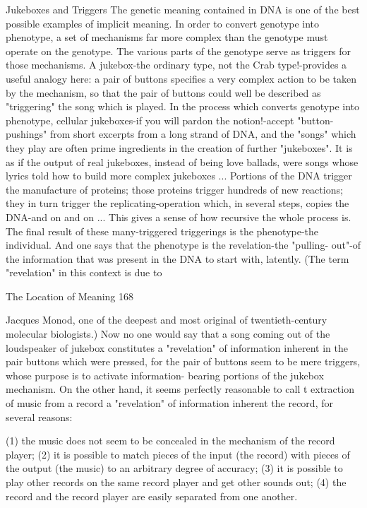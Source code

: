                                Jukeboxes and Triggers
The genetic meaning contained in DNA is one of the best possible examples of implicit
meaning. In order to convert genotype into phenotype, a set of mechanisms far more
complex than the genotype must operate on the genotype. The various parts of the
genotype serve as triggers for those mechanisms. A jukebox-the ordinary type, not the
Crab type!-provides a useful analogy here: a pair of buttons specifies a very complex
action to be taken by the mechanism, so that the pair of buttons could well be described
as "triggering" the song which is played. In the process which converts genotype into
phenotype, cellular jukeboxes-if you will pardon the notion!-accept "button-pushings"
from short excerpts from a long strand of DNA, and the "songs" which they play are
often prime ingredients in the creation of further "jukeboxes". It is as if the output of real
jukeboxes, instead of being love ballads, were songs whose lyrics told how to build more
complex jukeboxes ... Portions of the DNA trigger the manufacture of proteins; those
proteins trigger hundreds of new reactions; they in turn trigger the replicating-operation
which, in several steps, copies the DNA-and on and on ... This gives a sense of how
recursive the whole process is. The final result of these many-triggered triggerings is the
phenotype-the individual. And one says that the phenotype is the revelation-the "pulling-
out"-of the information that was present in the DNA to start with, latently. (The term
"revelation" in this context is due to




The Location of Meaning                                                                   168

Jacques Monod, one of the deepest and most original of twentieth-century molecular
biologists.)
        Now no one would say that a song coming out of the loudspeaker of jukebox
constitutes a "revelation" of information inherent in the pair buttons which were pressed,
for the pair of buttons seem to be mere triggers, whose purpose is to activate information-
bearing portions of the jukebox mechanism. On the other hand, it seems perfectly
reasonable to call t extraction of music from a record a "revelation" of information
inherent the record, for several reasons:

  (1) the music does not seem to be concealed in the mechanism of the record player;
  (2) it is possible to match pieces of the input (the record) with pieces of the output
      (the music) to an arbitrary degree of accuracy;
  (3) it is possible to play other records on the same record player and get other
      sounds out;
  (4) the record and the record player are easily separated from one another.

